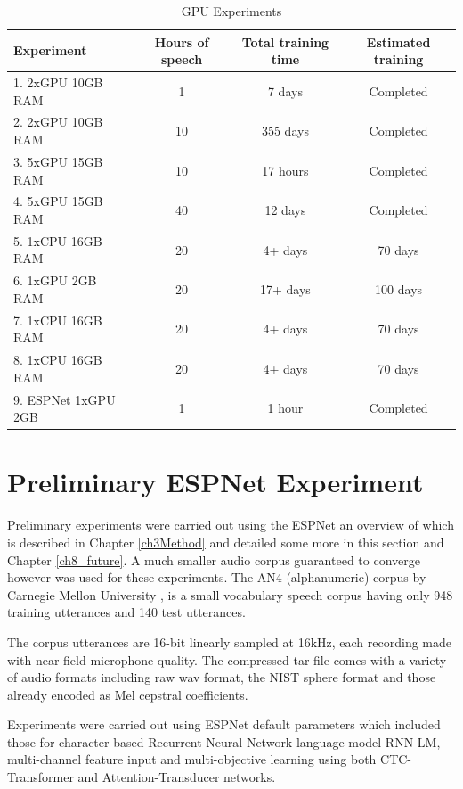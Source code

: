 \begin{table}
  \caption{GPU Experiments}
  \label{tab_c6_01_training}
\begin{tabular}{lccc}
\toprule
Experiment & Hours of speech & Total training time & Estimated training\\
\midrule
1. 2xGPU 10GB RAM & 1 & 7 days & Completed\\
2. 2xGPU 10GB RAM & 10 & 355 days & Completed\\
3. 5xGPU 15GB RAM & 10 & 17 hours & Completed\\
4. 5xGPU 15GB RAM & 40 & 12 days & Completed\\
5. 1xCPU 16GB RAM & 20 & 4+ days & 70 days\\
6. 1xGPU 2GB RAM & 20 & 17+ days & 100 days\\
7. 1xCPU 16GB RAM & 20 & 4+ days & 70 days\\
8. 1xCPU 16GB RAM & 20 & 4+ days & 70 days\\
9. ESPNet 1xGPU 2GB & 1 & 1 hour & Completed\\
\bottomrule
\end{tabular}
\end{table}

\section{Preliminary ESPNet Experiment}
Preliminary experiments were carried out using the ESPNet \citep{watanabe2018espnet} an overview of which is described in Chapter \ref{ch3Method} and detailed some more in this section and Chapter \ref{ch8_future}.  A much smaller audio corpus guaranteed to converge however was used for these experiments.  The AN4 (alphanumeric) corpus by Carnegie Mellon University \citep{acero1990acoustical}, is a small vocabulary speech corpus having only 948 training utterances and 140 test utterances.

The corpus utterances are 16-bit linearly sampled at 16kHz, each recording made with near-field microphone quality.  The compressed tar file comes with a variety of audio formats including raw wav format, the NIST sphere format and those already encoded as Mel cepstral coefficients.

Experiments were carried out using ESPNet default parameters which included those for character based-Recurrent Neural Network language model RNN-LM, multi-channel feature input and multi-objective learning using both CTC-Transformer and Attention-Transducer networks.

